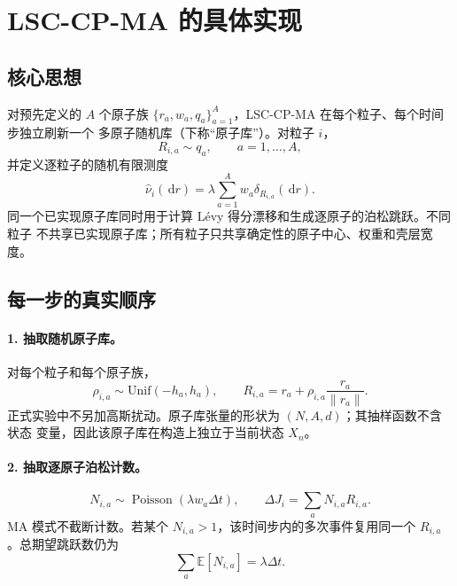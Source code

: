 \documentclass[11pt,a4paper]{article}
\newcommand{\dd}{\,\mathrm{d}}
\newcommand{\E}{\mathbb{E}}
\begin{document}
\section{LSC-CP-MA 的具体实现}

\subsection{核心思想}

对预先定义的 $A$ 个原子族
$\{r_a,w_a,q_a\}_{a=1}^{A}$，LSC-CP-MA 在每个粒子、每个时间步独立刷新一个
多原子随机库（下称“原子库”）。对粒子 $i$，
\begin{equation}
 R_{i,a}\sim q_a,\qquad a=1,\ldots,A,
\end{equation}
并定义逐粒子的随机有限测度
\begin{equation}
\widehat\nu_i(\dd r)
 =\lambda\sum_{a=1}^{A}w_a\delta_{R_{i,a}}(\dd r).
\end{equation}
同一个已实现原子库同时用于计算 Lévy 得分漂移和生成逐原子的泊松跳跃。不同粒子
不共享已实现原子库；所有粒子只共享确定性的原子中心、权重和壳层宽度。

\subsection{每一步的真实顺序}

\paragraph{1. 抽取随机原子库。}
对每个粒子和每个原子族，
\begin{equation}
 \rho_{i,a}\sim\mathrm{Unif}(-h_a,h_a),\qquad
 R_{i,a}=r_a+\rho_{i,a}\frac{r_a}{\|r_a\|}.
\end{equation}
正式实验中不另加高斯扰动。原子库张量的形状为 $(N,A,d)$；其抽样函数不含状态
变量，因此该原子库在构造上独立于当前状态 $X_n$。

\paragraph{2. 抽取逐原子泊松计数。}
\begin{equation}
 N_{i,a}\sim\operatorname{Poisson}(\lambda w_a\Delta t),
 \qquad
 \Delta J_i=\sum_aN_{i,a}R_{i,a}.
\end{equation}
MA 模式不截断计数。若某个 $N_{i,a}>1$，该时间步内的多次事件复用同一个
$R_{i,a}$。总期望跳跃数仍为
\begin{equation}
 \sum_a\E[N_{i,a}]=\lambda\Delta t.
\end{equation}
\end{document}
